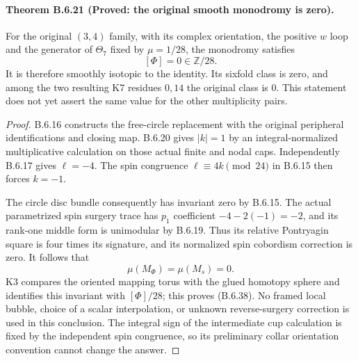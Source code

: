 

\paragraph{Theorem B.6.21 (Proved: the original smooth monodromy is zero).}
For the original $(3,4)$ family, with its complex orientation,
the positive $w$ loop and the generator of $\Theta_7$ fixed by
$\mu=1/28$, the monodromy satisfies
\[
                         [\Phi]=0\in\mathbb Z/28.
 \tag{B.6.38}
\]
It is therefore smoothly isotopic to the identity.  Its sixfold
class is zero, and among the two resulting K7 residues $0,14$
the original class is $0$.  This statement does not yet assert
the same value for the other multiplicity pairs.
\begin{proof}
B.6.16 constructs the free-circle replacement with the original
peripheral identifications and closing map.  B.6.20 gives
$|k|=1$ by an integral-normalized multiplicative calculation on
those actual finite and nodal caps.  Independently B.6.17 gives
$\ell=-4$.  The spin congruence $\ell\equiv4k\pmod {24}$
in B.6.15 then forces $k=-1$.

The circle disc bundle consequently has invariant zero by
B.6.15.  The actual parametrized spin surgery trace has
$p_1$ coefficient $-4-2(-1)=-2$, and its rank-one middle form
is unimodular by B.6.19.  Thus its relative Pontryagin square
is four times its signature, and its normalized spin
cobordism correction is zero.  It follows that
\[
 \mu(M_\Phi)=\mu(M_s)=0.
\]
K3 compares the oriented mapping torus with the glued
homotopy sphere and identifies this invariant with
$[\Phi]/28$; this proves (B.6.38).  No framed local bubble,
choice of a scalar interpolation, or unknown reverse-surgery
correction is used in this conclusion.  The integral sign
of the intermediate cup calculation is fixed by the
independent spin congruence, so its preliminary collar
orientation convention cannot change the answer.
\end{proof}

